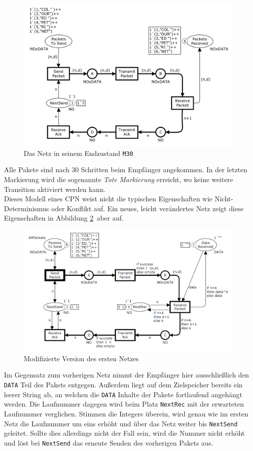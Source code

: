 \documentclass[11pt,onecolumn,a4paper,DIV=calc]{scrartcl}
\begin{document}
\begin{figure}[H]
    \centering
    \includegraphics[scale=0.28]{non30.png}
    \caption{Das Netz in seinem Endzustand \texttt{M30}}
    \label{m30}
\end{figure}
Alle Pakete sind nach 30 Schritten beim Empfänger angekommen. In der letzten Markierung wird die sogenannte \textit{Tote Markierung} erreicht, wo keine weitere Transition aktiviert werden kann.\\
Dieses Modell eines CPN weist nicht die typischen Eigenschaften wie Nicht-Determinismus oder Konflikt auf. Ein neues, leicht verändertes Netz zeigt diese Eigenschaften in Abbildung \ref{fig:modified}\ aber auf.
\begin{figure}[H]
    \centering
    \includegraphics[scale=0.4]{non2_1.PNG}
    \caption{Modifizierte Version des ersten Netzes}
    \label{fig:modified}
\end{figure}
Im Gegensatz zum vorherigen Netz nimmt der Empfänger hier ausschließlich den \texttt{DATA} Teil des Pakets entgegen. Außerdem liegt auf dem Zielspeicher bereits ein leerer String ab, an welchen die \texttt{DATA} Inhalte der Pakete fortlaufend angehängt werden. Die Laufnummer dagegen wird beim Platz \texttt{NextRec} mit der erwarteten Laufnummer verglichen. Stimmen die Integers überein, wird genau wie im ersten Netz die Laufnummer um eins erhöht und über das Netz weiter bis \texttt{NextSend} geleitet. Sollte dies allerdings nicht der Fall sein, wird die Nummer nicht erhöht und löst bei \texttt{NextSend} das erneute Senden des vorherigen Pakets aus.\\
\end{document}
